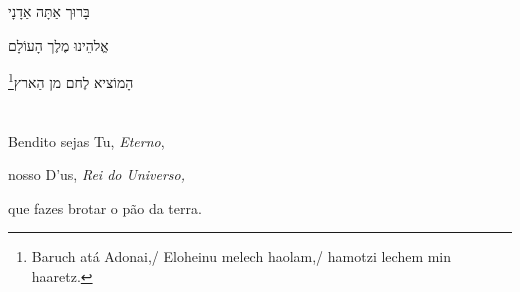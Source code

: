 בָּרוּך אַתָּה אַדָנָי

אֱלהֵינוּ מֶלֶך הָעוֹלָם

הָמוֹציא לֶחם מן הַארץ\footnote{Baruch atá Adonai,/ Eloheinu melech haolam,/ hamotzi lechem min haaretz.}

\movetooddpage
\raggedright

\section{}

Bendito sejas Tu, \emph{Eterno},

nosso D'us, \emph{Rei do Universo,}

que fazes brotar o pão da terra.
